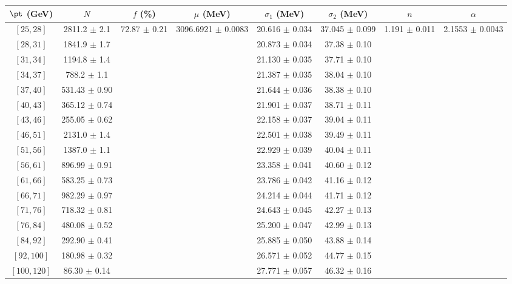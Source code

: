 \begin{tabular}{c||c|c|c|c|c|c|c}
$\pt$ (GeV) & $N$ & $f$ (\%) & $\mu$ (MeV) & $\sigma_1$ (MeV) & $\sigma_2$ (MeV) & $n$ & $\alpha$ \\
\hline
$[25, 28]$ & 2811.2 $\pm$ 2.1 & \multirow{17}{*}{72.87 $\pm$ 0.21} & \multirow{17}{*}{3096.6921 $\pm$ 0.0083} & 20.616 $\pm$ 0.034 & 37.045 $\pm$ 0.099 & \multirow{17}{*}{1.191 $\pm$ 0.011} & \multirow{17}{*}{2.1553 $\pm$ 0.0043}\\
$[28, 31]$ & 1841.9 $\pm$ 1.7 &  &  & 20.873 $\pm$ 0.034 & 37.38 $\pm$ 0.10 &  & \\
$[31, 34]$ & 1194.8 $\pm$ 1.4 &  &  & 21.130 $\pm$ 0.035 & 37.71 $\pm$ 0.10 &  & \\
$[34, 37]$ & 788.2 $\pm$ 1.1 &  &  & 21.387 $\pm$ 0.035 & 38.04 $\pm$ 0.10 &  & \\
$[37, 40]$ & 531.43 $\pm$ 0.90 &  &  & 21.644 $\pm$ 0.036 & 38.38 $\pm$ 0.10 &  & \\
$[40, 43]$ & 365.12 $\pm$ 0.74 &  &  & 21.901 $\pm$ 0.037 & 38.71 $\pm$ 0.11 &  & \\
$[43, 46]$ & 255.05 $\pm$ 0.62 &  &  & 22.158 $\pm$ 0.037 & 39.04 $\pm$ 0.11 &  & \\
$[46, 51]$ & 2131.0 $\pm$ 1.4 &  &  & 22.501 $\pm$ 0.038 & 39.49 $\pm$ 0.11 &  & \\
$[51, 56]$ & 1387.0 $\pm$ 1.1 &  &  & 22.929 $\pm$ 0.039 & 40.04 $\pm$ 0.11 &  & \\
$[56, 61]$ & 896.99 $\pm$ 0.91 &  &  & 23.358 $\pm$ 0.041 & 40.60 $\pm$ 0.12 &  & \\
$[61, 66]$ & 583.25 $\pm$ 0.73 &  &  & 23.786 $\pm$ 0.042 & 41.16 $\pm$ 0.12 &  & \\
$[66, 71]$ & 982.29 $\pm$ 0.97 &  &  & 24.214 $\pm$ 0.044 & 41.71 $\pm$ 0.12 &  & \\
$[71, 76]$ & 718.32 $\pm$ 0.81 &  &  & 24.643 $\pm$ 0.045 & 42.27 $\pm$ 0.13 &  & \\
$[76, 84]$ & 480.08 $\pm$ 0.52 &  &  & 25.200 $\pm$ 0.047 & 42.99 $\pm$ 0.13 &  & \\
$[84, 92]$ & 292.90 $\pm$ 0.41 &  &  & 25.885 $\pm$ 0.050 & 43.88 $\pm$ 0.14 &  & \\
$[92, 100]$ & 180.98 $\pm$ 0.32 &  &  & 26.571 $\pm$ 0.052 & 44.77 $\pm$ 0.15 &  & \\
$[100, 120]$ & 86.30 $\pm$ 0.14 &  &  & 27.771 $\pm$ 0.057 & 46.32 $\pm$ 0.16 &  & \\
\end{tabular}
